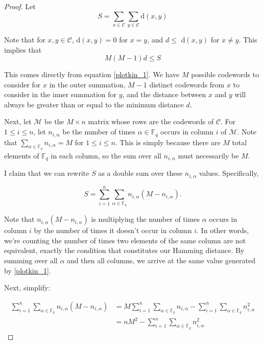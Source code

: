 \documentclass{article}
\theoremstyle{definition}
\numberwithin{exmp}{subsection}
\begin{document}
\begin{proof}
Let 
\begin{equation} \label{plotkin_1}
S = \sum_{x \in \mathcal{C}} \sum_{y \in \mathcal{C}} \text{d}(x,y)
\end{equation}

Note that for $x,y \in \mathcal{C}$, d$(x,y)=0$ for $x=y$, and $d \le$ d$(x,y)$ for $x\neq y$.  This implies that
\begin{equation} \label{plotkin_1_5}
M(M-1)d\le S
\end{equation}

This comes directly from equation \ref{plotkin_1}.  We have $M$ possible codewords to consider for $x$ in the outer summation, $M-1$ distinct codewords from $x$ to consider in the inner summation for $y$, 
and the distance between $x$ and $y$ will always be greater than or equal to the minimum distance $d$.

Next, let $\mathcal{M}$ be the $M \times n$ matrix whose rows are the codewords of $\mathcal{C}$.  For $1 \le i \le n$, let $n_{i,\alpha}$ be the number of times $\alpha \in
 \mathbb{F}_q$ occurs in column $i$ of $\mathcal{M}$.  Note that $\sum_{\alpha \in \mathbb{F}_q} n_{i,\alpha} = M$ for $1\le i \le n$.  This is simply because there are $M$ total
 elements of $\mathbb{F}_q$ in each column, so the sum over all $n_{i,\alpha}$ must necessarily be $M$.  

I claim that we can rewrite $S$ as a double sum over these $n_{i,\alpha}$ values.  Specifically,

\begin{equation}
S = \sum_{i=1}^{n} \sum_{\alpha\in\mathbb{F}_q} n_{i,\alpha}(M - n_{i,\alpha}).
\end{equation}

Note that $n_{i,\alpha}(M - n_{i,\alpha})$ is multiplying the number of times $\alpha$ occurs in column $i$ by the number of times it doesn't occur in column $i$.  In other words, we're counting the number of times two elements of the same
column are not equivalent, exactly the condition that constitutes our Hamming distance.   By summing over all $\alpha$ and then all columns, we arrive at the same value generated by \ref{plotkin_1}.

Next, simplify:

\begin{equation}
\begin{split}
\sum_{i=1}^{n} \sum_{\alpha\in\mathbb{F}_q} n_{i,\alpha}(M - n_{i,\alpha}) &= M\sum_{i=1}^{n} \sum_{\alpha\in\mathbb{F}_q} n_{i,\alpha} - \sum_{i=1}^{n} \sum_{\alpha\in\mathbb{F}_q} n_{i,\alpha}^2 \\
&= nM^2 - \sum_{i=1}^{n} \sum_{\alpha\in\mathbb{F}_q} n_{i,\alpha}^2
\end{split}
\end{equation}


\end{proof}
\end{document}
